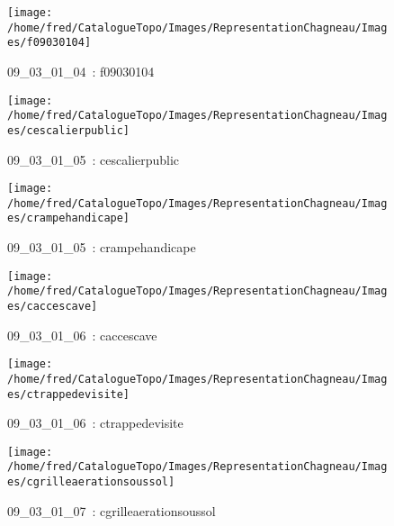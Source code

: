\documentclass[12pt,titlepage]{book}
\begin{document}
\begin{figure}[h!]
\begin{minipage}[t]{3cm}
\begin{center}
      \texttt{[image: /home/fred/CatalogueTopo/Images/RepresentationChagneau/Images/f09030104]}
      \caption[~09\_03\_01\_04]{\small{09\_03\_01\_04~:} \tiny{f09030104}}\label{f09030104}
    \end{center}
  \end{minipage}
  \begin{minipage}[t]{3cm}
    \begin{center}
      \texttt{[image: /home/fred/CatalogueTopo/Images/RepresentationChagneau/Images/cescalierpublic]}
      \caption[~09\_03\_01\_05]{\small{09\_03\_01\_05~:} \tiny{cescalierpublic}}\label{cescalierpublic}
    \end{center}
  \end{minipage}
  \begin{minipage}[t]{3cm}
    \begin{center}
      \texttt{[image: /home/fred/CatalogueTopo/Images/RepresentationChagneau/Images/crampehandicape]}
      \caption[~09\_03\_01\_05]{\small{09\_03\_01\_05~:} \tiny{crampehandicape}}\label{crampehandicape}
    \end{center}
  \end{minipage}
  \begin{minipage}[t]{3cm}
    \begin{center}
      \texttt{[image: /home/fred/CatalogueTopo/Images/RepresentationChagneau/Images/caccescave]}
      \caption[~09\_03\_01\_06]{\small{09\_03\_01\_06~:} \tiny{caccescave}}\label{caccescave}
    \end{center}
  \end{minipage}
  \begin{minipage}[t]{3cm}
    \begin{center}
      \texttt{[image: /home/fred/CatalogueTopo/Images/RepresentationChagneau/Images/ctrappedevisite]}
      \caption[~09\_03\_01\_06]{\small{09\_03\_01\_06~:} \tiny{ctrappedevisite}}\label{ctrappedevisite}
    \end{center}
  \end{minipage}
  \begin{minipage}[t]{3cm}
    \begin{center}
      \texttt{[image: /home/fred/CatalogueTopo/Images/RepresentationChagneau/Images/cgrilleaerationsoussol]}
      \caption[~09\_03\_01\_07]{\small{09\_03\_01\_07~:} \tiny{cgrilleaerationsoussol}}\label{cgrilleaerationsoussol}
    \end{center}
  \end{minipage}
\end{figure}
\end{document}
